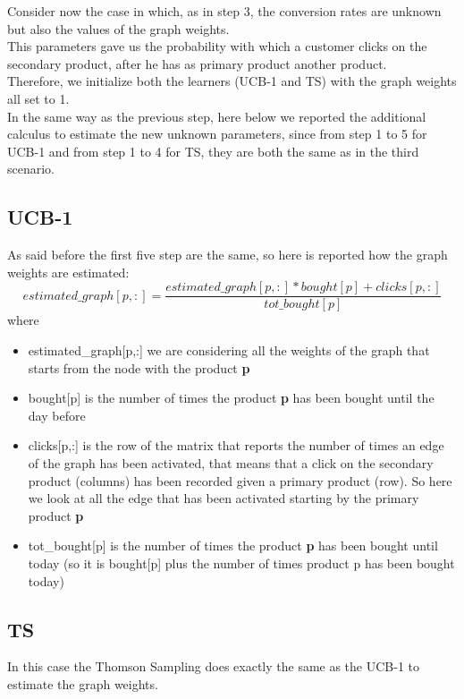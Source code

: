 Consider now the case in which, as in step 3, the conversion rates are unknown but also the values of the graph weights.\\ This parameters gave us the probability with which a customer clicks on the secondary product, after he has as primary product another product.\\ Therefore, we initialize both the learners (UCB-1 and TS) with the graph weights all set to 1.\\
In the same way as the previous step, here below we reported the additional calculus to estimate the new unknown parameters, since from step 1 to 5 for UCB-1 and from step 1 to 4 for TS, they are both the same as in the third scenario.

\subsection{UCB-1}
As said before the first five step are the same, so here is reported how the graph weights are estimated:
\begin{equation}
    estimated\_graph[p,:] = \frac{estimated\_graph[p,:] * bought[p] + clicks[p,:]}{tot\_bought[p]}
\end{equation}where \begin{itemize}
    \item estimated\_graph[p,:] we are considering all the weights of the graph that starts from the node with the product {\bf p}
    \item bought[p] is the number of times the product {\bf p} has been bought until the day before
    \item clicks[p,:] is the row of the matrix that reports the number of times an edge of the graph has been activated, that means that a click on the secondary product (columns) has been recorded given a primary product (row). So here we look at all the edge that has been activated starting by the primary product {\bf p}
    \item tot\_bought[p] is the number of times the product {\bf p} has been bought until today (so it is bought[p] plus the number of times product p has been bought today)
\end{itemize}
\subsection{TS}
In this case the Thomson Sampling does exactly the same as the UCB-1 to estimate the graph weights.
